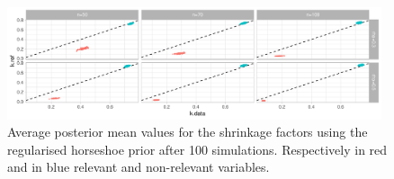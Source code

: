 \documentclass[american,]{article}
\theoremstyle{definition}
\begin{document}
\begin{figure}[tp]
  \centering
  \includegraphics[width=0.98\textwidth]{graphics/k_RHS.pdf}
  \caption{Average posterior mean values for the shrinkage factors using the regularised horseshoe prior after 100 simulations. Respectively in red and in blue relevant and non-relevant variables.\\}
  \label{fig:k}
\end{figure}
\end{document}
